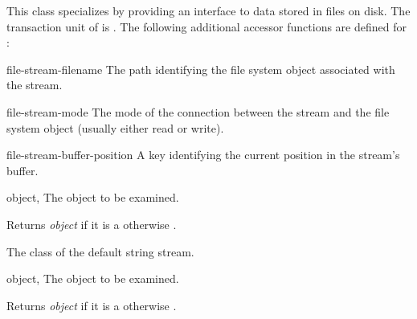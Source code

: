 \begin{optDefinition}
%
This class specializes  by providing an interface to data
stored in files on disk. The transaction unit of  is
. The following additional accessor functions are defined for
:
%
\begin{functions}
    \item[file-stream-filename] The path identifying the file system object
    associated with the stream.
    \item[file-stream-mode] The mode of the connection between the stream and
    the file system object (usually either read or write).
    \item[file-stream-buffer-position] A key identifying the current position in
    the stream's buffer.
\end{functions}

\begin{arguments}
  \item[object, \classref{object}] The object to be examined.
\end{arguments}
%
\result%
Returns {\em object\/} if it is a  otherwise \nil.

%
The class of the default string stream.

\begin{arguments}
    \item[object, \classref{object}] The object to be examined.
\end{arguments}
%
\result%
Returns {\em object\/} if it is a  otherwise \nil.



\end{optDefinition}
